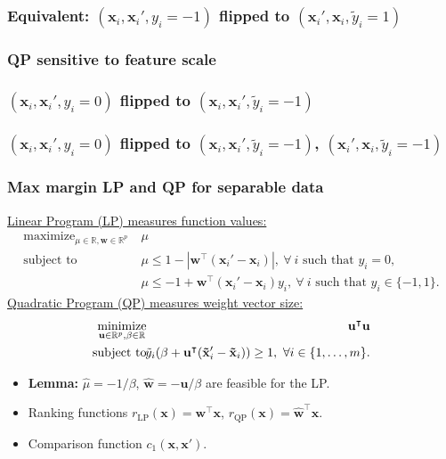 \documentclass{beamer}
\DeclareMathOperator*{\maximize}{maximize}
\DeclareMathOperator*{\minimize}{minimize}
\newcommand{\RR}{\mathbb R}
\begin{document}
\begin{frame}
  \frametitle{Equivalent: $(\mathbf x_i, \mathbf x_i', y_i=-1)$ flipped to $(\mathbf x_i', \mathbf x_i, \tilde y_i=1)$}
  
\end{frame}

\begin{frame}
  \frametitle{QP sensitive to feature scale}
  
\end{frame}

\begin{frame}
  \frametitle{$(\mathbf x_i, \mathbf x_i', y_i=0)$ flipped to
    $(\mathbf x_i, \mathbf x_i', \tilde y_i=-1)$
}
  
\end{frame}

\begin{frame}
  \frametitle{$(\mathbf x_i, \mathbf x_i', y_i=0)$ flipped to
    $(\mathbf x_i, \mathbf x_i', \tilde y_i=-1)$,
    $(\mathbf x_i', \mathbf x_i, \tilde y_i=-1)$
}
  
\end{frame}

\begin{frame}
  \frametitle{Max margin LP and QP for separable data}
  \underline{Linear Program (LP) measures function values:}
  \begin{equation*}
  \begin{aligned}
    \maximize_{\mu\in\RR, \mathbf w\in\RR^p}\ & \mu \\
    \text{subject to}\ & 
    \mu \leq 1-|\mathbf w^\intercal (\mathbf x_i' - \mathbf x_i)|,\
    \forall\  i\text{ such that }y_i=0,\\
    &\mu \leq -1 +  
    \mathbf w^\intercal(\mathbf x_i'-\mathbf x_i)y_i,
    \ \forall\ i\text{ such that }y_i\in\{-1,1\}.
  \end{aligned}
\end{equation*}
\vskip 0.5cm
  \underline{Quadratic Program (QP) measures weight vector size:}
\begin{eqnarray*}
  \label{eq:max-margin-qp-tilde}
  \minimize_{\mathbf u\in\RR^p, \beta\in\RR}\ &&\hskip -0.5cm
  \mathbf u^\intercal \mathbf u  \\
\nonumber    \text{subject to}\ &&\hskip -0.5cm 
    \tilde y_i (\beta + 
    \mathbf u^\intercal( \mathbf{\tilde x}_i'-\mathbf{\tilde x}_i) ) \geq 1,
    \ \forall i\in\{1,\dots,m\}.
\end{eqnarray*}
\begin{itemize}
\item 
\textbf{Lemma:} $\hat{\mu} = -1/\beta$, $\hat{ \mathbf{w}} =
-\mathbf{u}/\beta$ are feasible for the LP.\\
\item Ranking functions
  $r_{\text{LP}}(\mathbf x) = \mathbf w^\intercal \mathbf x$,
  $r_{\text{QP}}(\mathbf x) = \hat{\mathbf w}^\intercal \mathbf x$.
\item Comparison function $c_1(\mathbf x, \mathbf x')$.
\end{itemize}
\end{frame}
\end{document}
